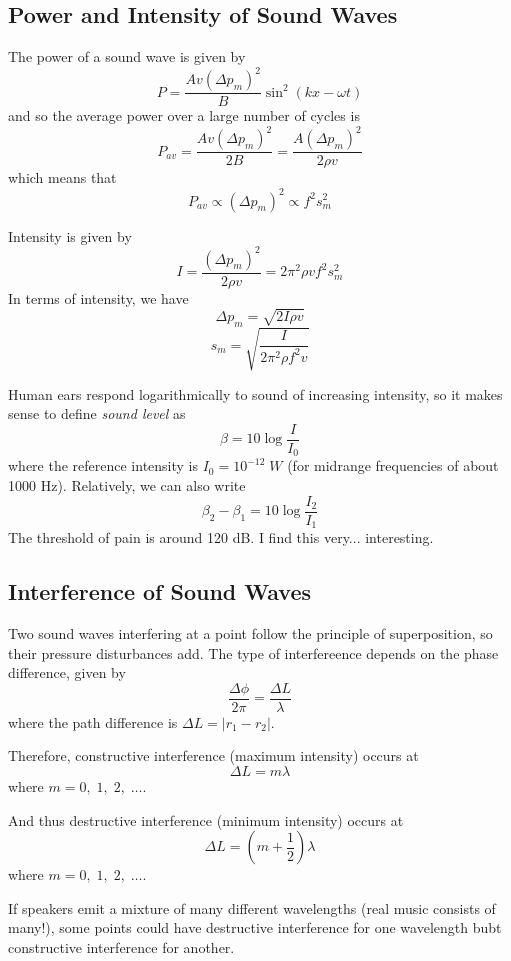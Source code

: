 \documentclass[../PhysicsFormulae.tex]{subfiles}
\begin{document}
\subsection{Power and Intensity of Sound Waves}
The power of a sound wave is given by 
\[ P = \frac{Av(\Delta p_m)^2}{B}\sin^2(kx - \omega t) \]
and so the average power over a large number of cycles is
\[ P_{av} = \frac{Av(\Delta p_m)^2}{2B} = \frac{A(\Delta p_m)^2}{2\rho v} \]
which means that 
\[ P_{av} \propto (\Delta p_m)^2 \propto f^2s_m^2 \] \bigskip

Intensity is given by
\[ I = \frac{(\Delta p_m)^2}{2\rho v} = 2\pi^2 \rho v f^2 s_m^2 \]
In terms of intensity, we have
\[ \Delta p_m = \sqrt{2I\rho v} \]
\[ s_m = \sqrt{\frac{I}{2\pi^2\rho f^2 v}} \] 

Human ears respond logarithmically to sound of increasing intensity, so it makes sense to define \textit{sound level} as 
\[ \beta = 10\log{\frac{I}{I_0}} \]
where the reference intensity is $I_0 = 10^{-12} \; W$ (for midrange frequencies of about 1000 Hz). Relatively, we can also write
\[ \beta_2 - \beta_1 = 10\log{\frac{I_2}{I_1}} \]
The threshold of pain is around 120 dB. I find this very... interesting.


\subsection{Interference of Sound Waves}
Two sound waves interfering at a point follow the principle of superposition, so their pressure disturbances add. The type of interfereence depends on the phase difference, given by
\[ \frac{\Delta \phi}{2\pi} = \frac{\Delta L}{\lambda} \]
where the path difference is $\Delta L = |r_1 - r_2|$. \bigskip

Therefore, constructive interference (maximum intensity) occurs at
\[ \Delta L = m\lambda \]
where $m = 0, \; 1, \; 2, \; \dots$. \bigskip

And thus destructive interference (minimum intensity) occurs at 
\[ \Delta L = \left(m + \frac{1}{2}\right)\lambda \]
where $m = 0, \; 1, \; 2, \; \dots$. \bigskip

If speakers emit a mixture of many different wavelengths (real music consists of many!), some points could have destructive interference for one wavelength bubt constructive interference for another. 
\end{document}
